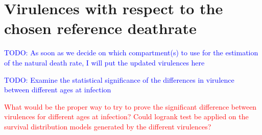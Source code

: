 \documentclass[10pt]{article}         %
\begin{document}
\section{Virulences with respect to the chosen reference deathrate}

\textcolor{blue}{TODO: As soon as we decide on which compartment(s) to use for the estimation of the natural death rate, I will put the updated virulences here}

\textcolor{blue}{TODO: Examine the statistical significance of the differences in virulence between different ages at infection}

\textcolor{red}{What would be the proper way to try to prove the significant difference between virulences for different ages at infection? Could logrank test be applied on the survival distribution models generated by the different virulences?}





\end{document}
